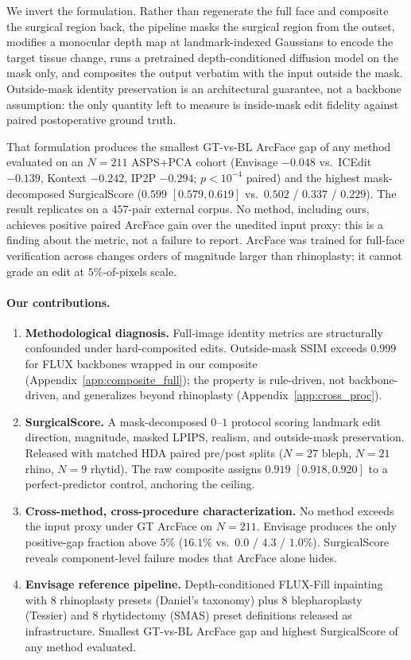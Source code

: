 \documentclass{article}
\newcommand{\method}{Envisage}
\begin{document}
We invert the formulation. Rather than regenerate the full face and
composite the surgical region back, the pipeline masks the surgical region
from the outset, modifies a monocular depth map at landmark-indexed
Gaussians to encode the target tissue change, runs a pretrained
depth-conditioned diffusion model on the mask only, and composites the
output verbatim with the input outside the mask. Outside-mask identity
preservation is an architectural guarantee, not a backbone assumption: the
only quantity left to measure is inside-mask edit fidelity against paired
postoperative ground truth.

That formulation produces the smallest GT-vs-BL ArcFace gap of any method
evaluated on an $N{=}211$ ASPS+PCA cohort (\method{} $-0.048$ vs.\
ICEdit $-0.139$, Kontext $-0.242$, IP2P $-0.294$; $p<10^{-4}$ paired) and
the highest mask-decomposed SurgicalScore ($0.599$ $[0.579, 0.619]$ vs.\
$0.502$ / $0.337$ / $0.229$). The result replicates on a $457$-pair external
corpus. No method, including ours, achieves positive paired ArcFace gain
over the unedited input proxy: this is a finding about the metric, not a
failure to report. ArcFace was trained for full-face verification across
changes orders of magnitude larger than rhinoplasty; it cannot grade an
edit at $5\%$-of-pixels scale.

\paragraph{Our contributions.}
\begin{enumerate}
\item \textbf{Methodological diagnosis.} Full-image identity metrics are
structurally confounded under hard-composited edits. Outside-mask SSIM exceeds
$0.999$ for FLUX backbones wrapped in our composite
(Appendix~\ref{app:composite_full}); the property is rule-driven, not
backbone-driven, and generalizes beyond rhinoplasty
(Appendix~\ref{app:cross_proc}).
\item \textbf{SurgicalScore.} A mask-decomposed $0$--$1$ protocol scoring
landmark edit direction, magnitude, masked LPIPS, realism, and outside-mask
preservation. Released with matched HDA paired pre/post splits
($N{=}27$ bleph, $N{=}21$ rhino, $N{=}9$ rhytid). The raw composite assigns
$0.919$ $[0.918, 0.920]$ to a perfect-predictor control, anchoring the
ceiling.
\item \textbf{Cross-method, cross-procedure characterization.} No method
exceeds the input proxy under GT ArcFace on $N{=}211$. \method{} produces
the only positive-gap fraction above $5\%$ ($16.1\%$ vs.\ $0.0$ / $4.3$ /
$1.0\%$). SurgicalScore reveals component-level failure modes that ArcFace
alone hides.
\item \textbf{\method{} reference pipeline.} Depth-conditioned FLUX-Fill
inpainting with $8$ rhinoplasty presets (Daniel's taxonomy) plus $8$
blepharoplasty (Tessier) and $8$ rhytidectomy (SMAS) preset definitions
released as infrastructure. Smallest GT-vs-BL ArcFace gap and highest
SurgicalScore of any method evaluated.
\end{enumerate}
\end{document}
